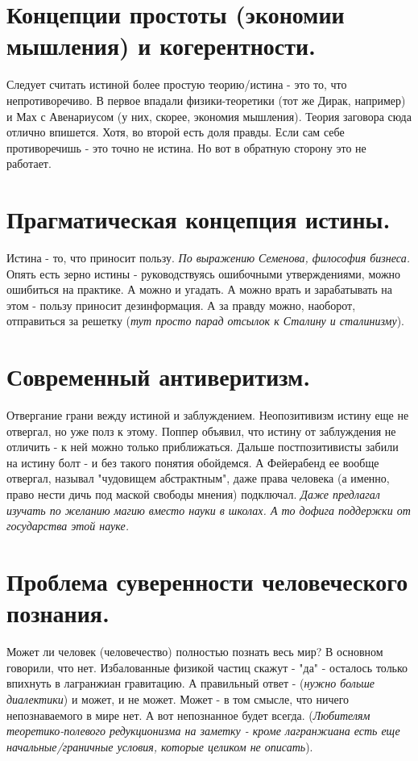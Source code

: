 \section{ Концепции простоты (экономии мышления) и когерентности.}
Следует считать истиной более простую теорию/истина - это то, что непротиворечиво. В первое впадали физики-теоретики (тот же Дирак, например) и Мах с Авенариусом (у них, скорее, экономия мышления). Теория заговора сюда отлично впишется. Хотя, во второй есть доля правды. Если сам себе противоречишь - это точно не истина. Но вот в обратную сторону это не работает.

\section{ Прагматическая концепция истины.}
Истина - то, что приносит пользу. \textit{По выражению Семенова, философия бизнеса.} Опять есть зерно истины - руководствуясь ошибочными утверждениями, можно ошибиться на практике. А можно и угадать. А можно врать и зарабатывать на этом - пользу приносит дезинформация. А за правду можно, наоборот, отправиться за решетку (\textit{тут просто парад отсылок к Сталину и сталинизму}). 

\section{ Современный антиверитизм.}
Отвергание грани вежду истиной и заблуждением. Неопозитивизм истину еще не отвергал, но уже полз к этому. Поппер объявил, что истину от заблуждения не отличить - к ней можно только приближаться. Дальше постпозитивисты забили на истину болт - и без такого понятия обойдемся. А Фейерабенд ее вообще отвергал, называл "чудовищем абстрактным", даже права человека (а именно, право нести дичь под маской свободы мнения) подключал. \textit{Даже предлагал изучать по желанию магию вместо науки в школах. А то дофига поддержки от государства этой науке.}

\section{ Проблема суверенности человеческого познания.}
Может ли человек (человечество) полностью познать весь мир? В основном говорили, что нет. Избалованные физикой частиц скажут - "да" - осталось только впихнуть в лагранжиан гравитацию. А правильный ответ - (\textit{нужно больше диалектики}) и может, и не может. Может - в том смысле, что ничего непознаваемого в мире нет. А вот непознанное будет всегда. (\textit{Любителям теоретико-полевого редукционизма на заметку - кроме лагранжиана есть еще начальные/граничные условия, которые целиком не описать}).

